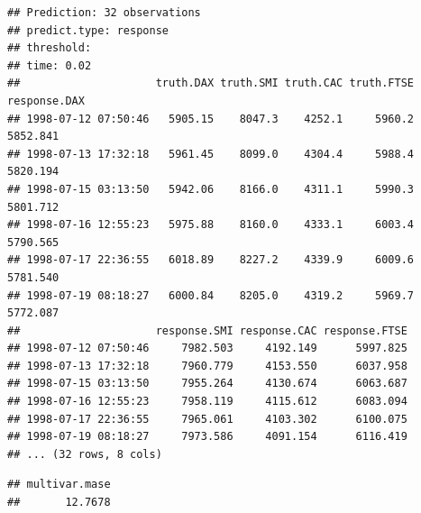 \documentclass[12pt]{article}%
\theoremstyle{definition}
\begin{document}
\singlespacing
\begin{knitrout}
\color{fgcolor}\begin{kframe}
\begin{alltt}
 \hlkwb{=}   
\end{alltt}
\begin{verbatim}
## Prediction: 32 observations
## predict.type: response
## threshold: 
## time: 0.02
##                     truth.DAX truth.SMI truth.CAC truth.FTSE response.DAX
## 1998-07-12 07:50:46   5905.15    8047.3    4252.1     5960.2     5852.841
## 1998-07-13 17:32:18   5961.45    8099.0    4304.4     5988.4     5820.194
## 1998-07-15 03:13:50   5942.06    8166.0    4311.1     5990.3     5801.712
## 1998-07-16 12:55:23   5975.88    8160.0    4333.1     6003.4     5790.565
## 1998-07-17 22:36:55   6018.89    8227.2    4339.9     6009.6     5781.540
## 1998-07-19 08:18:27   6000.84    8205.0    4319.2     5969.7     5772.087
##                     response.SMI response.CAC response.FTSE
## 1998-07-12 07:50:46     7982.503     4192.149      5997.825
## 1998-07-13 17:32:18     7960.779     4153.550      6037.958
## 1998-07-15 03:13:50     7955.264     4130.674      6063.687
## 1998-07-16 12:55:23     7958.119     4115.612      6083.094
## 1998-07-17 22:36:55     7965.061     4103.302      6100.075
## 1998-07-19 08:18:27     7973.586     4091.154      6116.419
## ... (32 rows, 8 cols)
\end{verbatim}
\begin{alltt}
             
\end{alltt}
\begin{verbatim}
## multivar.mase 
##       12.7678
\end{verbatim}
\end{kframe}
\end{knitrout}
\end{document}
